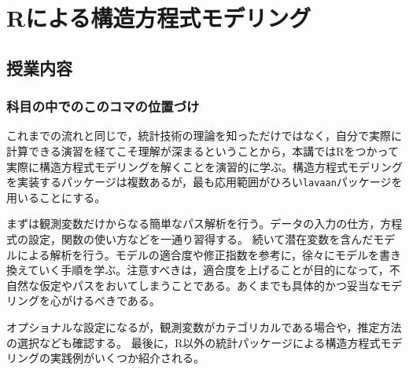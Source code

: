 \section{Rによる構造方程式モデリング}
\subsection{授業内容}
\subsubsection{科目の中でのこのコマの位置づけ}
これまでの流れと同じで，統計技術の理論を知っただけではなく，自分で実際に計算できる演習を経てこそ理解が深まるということから，本講ではRをつかって実際に構造方程式モデリングを解くことを演習的に学ぶ。構造方程式モデリングを実装するパッケージは複数あるが，最も応用範囲がひろい\texttt{lavaan}パッケージを用いることにする。

まずは観測変数だけからなる簡単なパス解析を行う。データの入力の仕方，方程式の設定，関数の使い方などを一通り習得する。
続いて潜在変数を含んだモデルによる解析を行う。モデルの適合度や修正指数を参考に，徐々にモデルを書き換えていく手順を学ぶ。注意すべきは，適合度を上げることが目的になって，不自然な仮定やパスをおいてしまうことである。あくまでも具体的かつ妥当なモデリングを心がけるべきである。

オプショナルな設定になるが，観測変数がカテゴリカルである場合や，推定方法の選択なども確認する。
最後に，R以外の統計パッケージによる構造方程式モデリングの実践例がいくつか紹介される。

